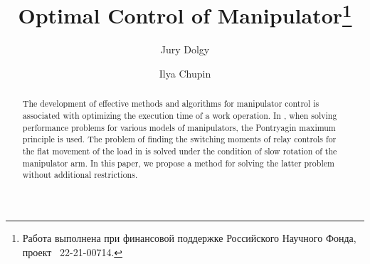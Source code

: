 \begin{englishtitle} %
\title{Optimal Control of Manipulator\thanks{Работа выполнена при финансовой поддержке Российского Научного Фонда, проект \textnumero~22-21-00714.}}
\author{Jury Dolgy 
  \and
  Ilya Chupin
}

\maketitle

\begin{abstract}
The development of effective methods and algorithms for manipulator control is associated with optimizing the execution time of a work operation. In \cite{Chernousko}, when solving performance problems for various models of manipulators, the Pontryagin maximum principle is used. The problem of finding the switching moments of relay controls for the flat movement of the load in \cite{Akulenko} is solved under the condition of slow rotation of the manipulator arm. In this paper, we propose a method for solving the latter problem without additional restrictions.

\end{abstract}
\end{englishtitle}

\iffalse

%
%

